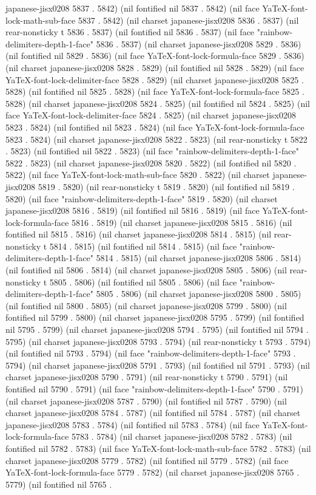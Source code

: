japanese-jisx0208 5837 . 5842) (nil fontified nil 5837 . 5842) (nil face YaTeX-font-lock-math-sub-face 5837 . 5842) (nil charset japanese-jisx0208 5836 . 5837) (nil rear-nonsticky t 5836 . 5837) (nil fontified nil 5836 . 5837) (nil face "rainbow-delimiters-depth-1-face" 5836 . 5837) (nil charset japanese-jisx0208 5829 . 5836) (nil fontified nil 5829 . 5836) (nil face YaTeX-font-lock-formula-face 5829 . 5836) (nil charset japanese-jisx0208 5828 . 5829) (nil fontified nil 5828 . 5829) (nil face YaTeX-font-lock-delimiter-face 5828 . 5829) (nil charset japanese-jisx0208 5825 . 5828) (nil fontified nil 5825 . 5828) (nil face YaTeX-font-lock-formula-face 5825 . 5828) (nil charset japanese-jisx0208 5824 . 5825) (nil fontified nil 5824 . 5825) (nil face YaTeX-font-lock-delimiter-face 5824 . 5825) (nil charset japanese-jisx0208 5823 . 5824) (nil fontified nil 5823 . 5824) (nil face YaTeX-font-lock-formula-face 5823 . 5824) (nil charset japanese-jisx0208 5822 . 5823) (nil rear-nonsticky t 5822 . 5823) (nil fontified nil 5822 . 5823) (nil face "rainbow-delimiters-depth-1-face" 5822 . 5823) (nil charset japanese-jisx0208 5820 . 5822) (nil fontified nil 5820 . 5822) (nil face YaTeX-font-lock-math-sub-face 5820 . 5822) (nil charset japanese-jisx0208 5819 . 5820) (nil rear-nonsticky t 5819 . 5820) (nil fontified nil 5819 . 5820) (nil face "rainbow-delimiters-depth-1-face" 5819 . 5820) (nil charset japanese-jisx0208 5816 . 5819) (nil fontified nil 5816 . 5819) (nil face YaTeX-font-lock-formula-face 5816 . 5819) (nil charset japanese-jisx0208 5815 . 5816) (nil fontified nil 5815 . 5816) (nil charset japanese-jisx0208 5814 . 5815) (nil rear-nonsticky t 5814 . 5815) (nil fontified nil 5814 . 5815) (nil face "rainbow-delimiters-depth-1-face" 5814 . 5815) (nil charset japanese-jisx0208 5806 . 5814) (nil fontified nil 5806 . 5814) (nil charset japanese-jisx0208 5805 . 5806) (nil rear-nonsticky t 5805 . 5806) (nil fontified nil 5805 . 5806) (nil face "rainbow-delimiters-depth-1-face" 5805 . 5806) (nil charset japanese-jisx0208 5800 . 5805) (nil fontified nil 5800 . 5805) (nil charset japanese-jisx0208 5799 . 5800) (nil fontified nil 5799 . 5800) (nil charset japanese-jisx0208 5795 . 5799) (nil fontified nil 5795 . 5799) (nil charset japanese-jisx0208 5794 . 5795) (nil fontified nil 5794 . 5795) (nil charset japanese-jisx0208 5793 . 5794) (nil rear-nonsticky t 5793 . 5794) (nil fontified nil 5793 . 5794) (nil face "rainbow-delimiters-depth-1-face" 5793 . 5794) (nil charset japanese-jisx0208 5791 . 5793) (nil fontified nil 5791 . 5793) (nil charset japanese-jisx0208 5790 . 5791) (nil rear-nonsticky t 5790 . 5791) (nil fontified nil 5790 . 5791) (nil face "rainbow-delimiters-depth-1-face" 5790 . 5791) (nil charset japanese-jisx0208 5787 . 5790) (nil fontified nil 5787 . 5790) (nil charset japanese-jisx0208 5784 . 5787) (nil fontified nil 5784 . 5787) (nil charset japanese-jisx0208 5783 . 5784) (nil fontified nil 5783 . 5784) (nil face YaTeX-font-lock-formula-face 5783 . 5784) (nil charset japanese-jisx0208 5782 . 5783) (nil fontified nil 5782 . 5783) (nil face YaTeX-font-lock-math-sub-face 5782 . 5783) (nil charset japanese-jisx0208 5779 . 5782) (nil fontified nil 5779 . 5782) (nil face YaTeX-font-lock-formula-face 5779 . 5782) (nil charset japanese-jisx0208 5765 . 5779) (nil fontified nil 5765 . 